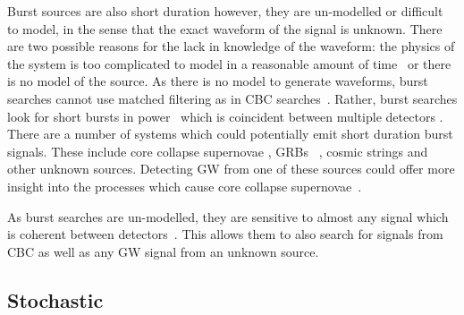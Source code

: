 Burst sources are also short duration however, they are un-modelled or
difficult to model, in the sense that the exact waveform of the signal is
unknown.  There are two possible reasons for the lack in knowledge of the
waveform: the physics of the system is too complicated to model in a reasonable
amount of time~ or there is no model of the source.  As there is
no model to generate waveforms, burst searches cannot use matched filtering as
in \gls{CBC} searches~. Rather, burst searches look
for short bursts in power~
which is coincident between multiple detectors
\citep{cornish2015BayeswaveBayesian, klimenko2008CoherentMethod}.  There are a
number of systems which could potentially emit  short duration burst signals.
These include core collapse supernovae \citep{ott2008GravitationalWave},
\glspl{GRB} \citep{aasi2014SearchGravitational}~, cosmic strings
\citep{damour2005GravitationalRadiation} and other unknown sources.  Detecting
\gls{GW} from one of these sources could offer more insight into the processes
which cause core collapse supernovae~. 

As burst searches are un-modelled, they are sensitive to almost any signal
which is coherent between detectors~. This allows them to also search for signals from \gls{CBC} as
well as any \gls{GW} signal from an unknown source.~


\subsection{Stochastic}

